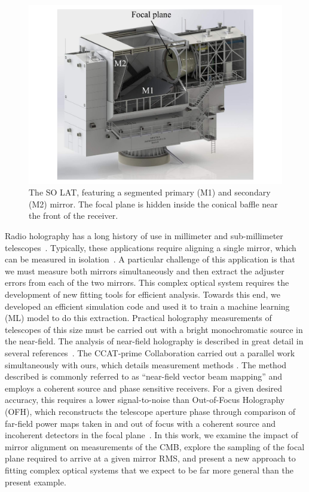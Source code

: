 \begin{figure}[t]
    \centering
    \includegraphics[width=.8\textwidth]{Figures/so_lat.pdf}
    \caption{The SO LAT, featuring a segmented primary (M1) and secondary (M2) mirror.  The focal plane is hidden inside the conical baffle near the front of the receiver. }
    \label{fig:ccat_geo}
\end{figure}

Radio holography has a long history of use in millimeter and sub-millimeter telescopes~\cite{alma_holog,Sridharan,7228408,5722985,morris:1143663,Fienup:93}.  Typically, these applications require aligning a single mirror, which can be measured in isolation~\cite{1141354,Hunter2011}.  A particular challenge of this application is that we must measure both mirrors simultaneously and then extract the adjuster errors from each of the two mirrors.  This complex optical system requires the development of new fitting tools for efficient analysis.  Towards this end, we developed an efficient simulation code and used it to train a machine learning (ML) model to do this extraction.
Practical holography measurements of telescopes of this size must be carried out with a bright monochromatic source in the near-field.  The analysis of near-field holography is described in great detail in several references~\cite{alma_holog,5722985,1190}.  The CCAT-prime Collaboration carried out a parallel work simultaneously with ours, which details measurement methods \cite{fyst_holog}.  The method described is commonly referred to as “near-field vector beam mapping” and employs a coherent source and phase sensitive receivers.  For a given desired accuracy, this requires a lower signal-to-noise than Out-of-Focus Holography (OFH), which reconstructs the telescope aperture phase through comparison of far-field power maps taken in and out of focus with a coherent source and incoherent detectors in the focal plane~\cite{Serabyn:91}.  In this work, we examine the impact of mirror alignment on measurements of the CMB, explore the sampling of the focal plane required to arrive at a given mirror RMS, and  present a new approach to fitting complex optical systems that we expect to be far more general than the present example.

